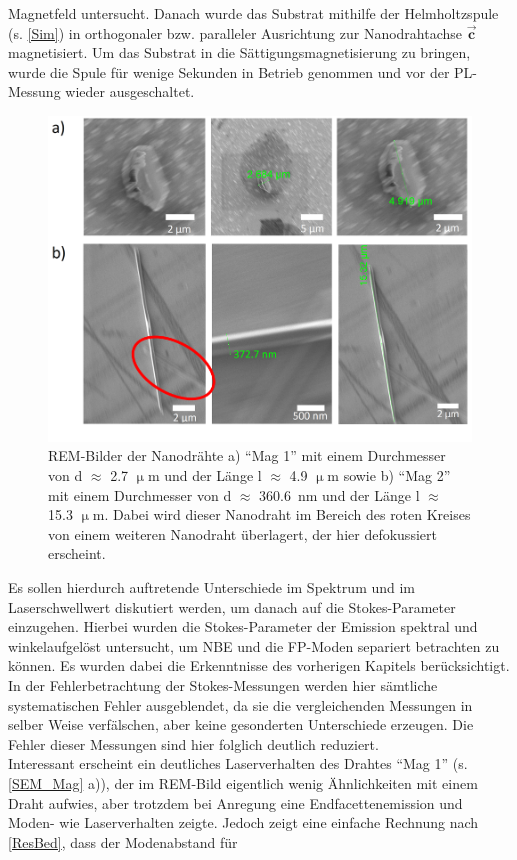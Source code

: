 Magnetfeld untersucht. Danach wurde das Substrat mithilfe der Helmholtzspule (s.
\autoref{Sim}) in orthogonaler bzw. paralleler Ausrichtung zur Nanodrahtachse
$\vec{\textbf{c}}$ magnetisiert. Um das Substrat in die Sättigungsmagnetisierung
zu bringen, wurde die Spule für wenige Sekunden in Betrieb genommen und vor der
PL-Messung wieder ausgeschaltet.\\ \begin{figure} \centering
\includegraphics[width=.66\textwidth]{Bilder/Mag/SEM_Mag1} \caption{REM-Bilder
der Nanodrähte a) ``Mag 1'' mit einem Durchmesser von d $\approx$ 2.7 $\upmu$m
und der Länge l $\approx$ 4.9 $\upmu$m sowie b) ``Mag 2'' mit einem Durchmesser
von d $\approx$ \mbox{360.6 nm} und der Länge l $\approx$ 15.3 $\upmu$m. Dabei
wird dieser Nanodraht im Bereich des roten Kreises von einem weiteren Nanodraht
überlagert, der hier defokussiert erscheint.} \label{SEM_Mag} \end{figure} Es
sollen hierdurch auftretende Unterschiede im Spektrum und im Laserschwellwert
diskutiert werden, um danach auf die Stokes-Parameter einzugehen. Hierbei wurden
die Stokes-Parameter der Emission spektral und winkelaufgelöst untersucht, um
NBE und die FP-Moden separiert betrachten zu können. Es wurden dabei die
Erkenntnisse des vorherigen Kapitels berücksichtigt. In der Fehlerbetrachtung
der Stokes-Messungen werden hier sämtliche systematischen Fehler ausgeblendet,
da sie die vergleichenden Messungen in selber Weise verfälschen, aber keine
gesonderten Unterschiede erzeugen. Die Fehler dieser Messungen sind hier
folglich deutlich reduziert.\\ Interessant erscheint ein deutliches
Laserverhalten des Drahtes ``Mag 1'' (s. \autoref{SEM_Mag} a)), der im REM-Bild
eigentlich wenig Ähnlichkeiten mit einem Draht aufwies, aber trotzdem bei
Anregung eine Endfacettenemission und Moden- wie Laserverhalten zeigte. Jedoch
zeigt eine einfache Rechnung nach \autoref{ResBed}, dass der Modenabstand für
